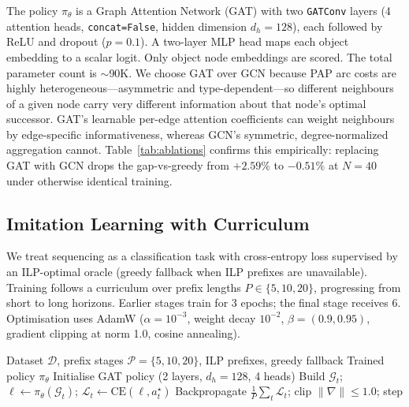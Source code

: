 \documentclass[conference]{IEEEtran}
\begin{document}
The policy $\pi_\theta$ is a Graph Attention Network (GAT) with two \texttt{GATConv} layers (4 attention heads, \texttt{concat=False}, hidden dimension $d_h{=}128$), each followed by ReLU and dropout ($p{=}0.1$). A two-layer MLP head maps each object embedding to a scalar logit. Only object node embeddings are scored. The total parameter count is ${\sim}$90K. We choose GAT over GCN because PAP arc costs are highly heterogeneous---asymmetric and type-dependent---so different neighbours of a given node carry very different information about that node's optimal successor. GAT's learnable per-edge attention coefficients can weight neighbours by edge-specific informativeness, whereas GCN's symmetric, degree-normalized aggregation cannot. Table~\ref{tab:ablations} confirms this empirically: replacing GAT with GCN drops the gap-vs-greedy from $+2.59\%$ to $-0.51\%$ at $N{=}40$ under otherwise identical training.

\subsection{Imitation Learning with Curriculum}

We treat sequencing as a classification task with cross-entropy loss supervised by an ILP-optimal oracle (greedy fallback when ILP prefixes are unavailable). Training follows a curriculum over prefix lengths $P \in \{5, 10, 20\}$, progressing from short to long horizons. Earlier stages train for 3 epochs; the final stage receives 6. Optimisation uses AdamW \cite{loshchilov2019adamw} ($\alpha{=}10^{-3}$, weight decay $10^{-2}$, $\beta{=}(0.9, 0.95)$, gradient clipping at norm 1.0, cosine annealing).

\begin{algorithm}[htbp]
\caption{Curriculum-Based Imitation Learning}
\label{alg:training}
\begin{algorithmic}[1]
\REQUIRE Dataset $\mathcal{D}$, prefix stages $\mathcal{P}{=}\{5,10,20\}$, ILP prefixes, greedy fallback
\ENSURE Trained policy $\pi_\theta$
\STATE Initialise GAT policy (2 layers, $d_h{=}128$, 4 heads)
                \STATE Build $\mathcal{G}_t$; $\ell \leftarrow \pi_\theta(\mathcal{G}_t)$; $\mathcal{L}_t \leftarrow \text{CE}(\ell, a_t^\star)$
            \ENDFOR
            \STATE Backpropagate $\frac{1}{P}\sum_t \mathcal{L}_t$; clip $\|\nabla\|{\le}1.0$; step
        \ENDFOR
    \ENDFOR
\ENDFOR
\end{algorithmic}
\end{algorithm}
\end{document}
